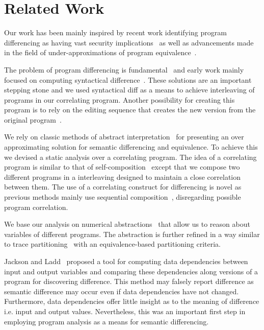 \section{Related Work} 

Our work has been mainly inspired by recent work identifying program differencing as having vast security implications~\cite{BrumleyPoosankamSongZheng08,SongSunZhang09} as well as advancements made in the field of under-approximations of program equivalence~\cite{GodlinStrichman09,KawaguchiLahiriRebelo10,DwyerElbaumPerson08,EnglerRamos11}.

The problem of program differencing is fundamental~\cite{Hoare69} and early work mainly focused on computing syntactical difference~\cite{HuntMcIlroy75}. These solutions are an important stepping stone and we used syntactical diff as a means to achieve interleaving of programs in our correlating program. Another possibility for creating this program is to rely on the editing sequence that creates the new version from the original program~\cite{Horwitz90}.

We rely on classic methods of abstract interpretation~\cite{CousotCousot77} for presenting an over approximating solution for semantic differencing and equivalence. To achieve this we devised a static analysis over a correlating program. The idea of a correlating program is similar to that of self-composition~\cite{AikenTerauchi05} except that we compose two different programs in a interleaving designed to maintain a close correlation between them. The use of a correlating construct for differencing is novel as previous methods mainly use sequential composition~\cite{GodlinStrichman09,DwyerElbaumPerson08,EnglerRamos11}, disregarding possible program correlation.

We base our analysis on numerical abstractions~\cite{CousotHalbwachs78,Mine2006} that allow us to reason about variables of different programs. The abstraction is further refined in a way similar to trace partitioning~\cite{MauborgneRival07} with an equivalence-based partitioning criteria.

Jackson and Ladd~\cite{JacksonLadd94} proposed a tool for computing data dependencies between input and output variables and comparing these dependencies along versions of a program for discovering difference. This method may falsely report difference as semantic difference may occur even if data dependencies have not changed. Furthermore, data dependencies offer little insight as to the meaning of difference i.e. input and output values. Nevertheless, this was an important first step in employing program analysis as a means for semantic differencing.

